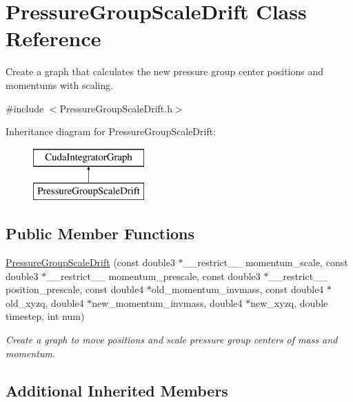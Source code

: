 \hypertarget{classPressureGroupScaleDrift}{}\section{Pressure\+Group\+Scale\+Drift Class Reference}
\label{classPressureGroupScaleDrift}


Create a graph that calculates the new pressure group center positions and momentums with scaling.  




{\ttfamily \#include $<$Pressure\+Group\+Scale\+Drift.\+h$>$}

Inheritance diagram for Pressure\+Group\+Scale\+Drift\+:\begin{figure}[H]
\begin{center}
\leavevmode
\includegraphics[height=2.000000cm]{classPressureGroupScaleDrift}
\end{center}
\end{figure}
\subsection*{Public Member Functions}
\begin{DoxyCompactItemize}
\item 
\hyperlink{classPressureGroupScaleDrift_a8cf59e5fe7570632084b614bd2000790}{Pressure\+Group\+Scale\+Drift} (const double3 $\ast$\+\_\+\+\_\+restrict\+\_\+\+\_\+ momentum\+\_\+scale, const double3 $\ast$\+\_\+\+\_\+restrict\+\_\+\+\_\+ momentum\+\_\+prescale, const double3 $\ast$\+\_\+\+\_\+restrict\+\_\+\+\_\+ position\+\_\+prescale, const double4 $\ast$old\+\_\+momentum\+\_\+invmass, const double4 $\ast$old\+\_\+xyzq, double4 $\ast$new\+\_\+momentum\+\_\+invmass, double4 $\ast$new\+\_\+xyzq, double timestep, int num)
\begin{DoxyCompactList}\small\item\em Create a graph to move positions and scale pressure group centers of mass and momentum. \end{DoxyCompactList}\end{DoxyCompactItemize}
\subsection*{Additional Inherited Members}


